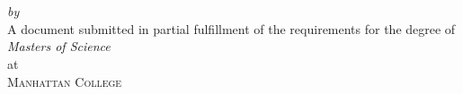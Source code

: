 \begin{titlepage}
  \vspace*{5cm}
  \makeatletter
  \begin{center}
    \begin{Huge}
      \@title
    \end{Huge}\\[0.1cm]
    \begin{Large}
      \@subtitle
    \end{Large}\\
    \emph{by}\\
    \@author
    \vfill
    A document submitted in partial fulfillment
    of the requirements for the degree of\\
    \emph{Masters of Science}\\
    at\\
    \textsc{Manhattan College}
  \end{center}
  \makeatother
\end{titlepage}

\newpage
\null
\thispagestyle{empty}
\newpage
